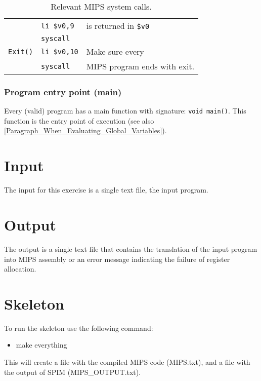 \documentclass{article}
\begin{document}
\begin{table}[h]
\begin{tabular}{|l|l|l|}
                  & \verb"li $v0,9"  & is returned in \verb"$v0" \\
                  & \verb"syscall"   &                           \\
\hline
\verb"Exit()"    & \verb"li $v0,10" & Make sure every              \\
                 & \verb"syscall"   & MIPS program ends with exit. \\
\hline
\end{tabular}
\caption{Relevant MIPS system calls.
\label{Table_MIPS_System_Calls}}
\end{table}
\subsubsection{Program entry point (main)}
\label{subsection_Program_Entry_Point_Main}
Every (valid) \plname program has a main function with signature: \verb"void main()".
This function is the entry point of execution (see also \ref{Paragraph_When_Evaluating_Global_Variables}).

\section{Input}
The input for this exercise is a single text file, the input \plname program.

\section{Output}
The output is a single text file that contains the
translation of the input program into MIPS assembly or an error message indicating the failure of register allocation.

\section{Skeleton}
To run the skeleton use the following command:
\begin{itemize}
\item make everything
\end{itemize}
This will create a file with the compiled MIPS code (MIPS.txt), and a file with the output of SPIM (MIPS\_OUTPUT.txt).
\end{document}
